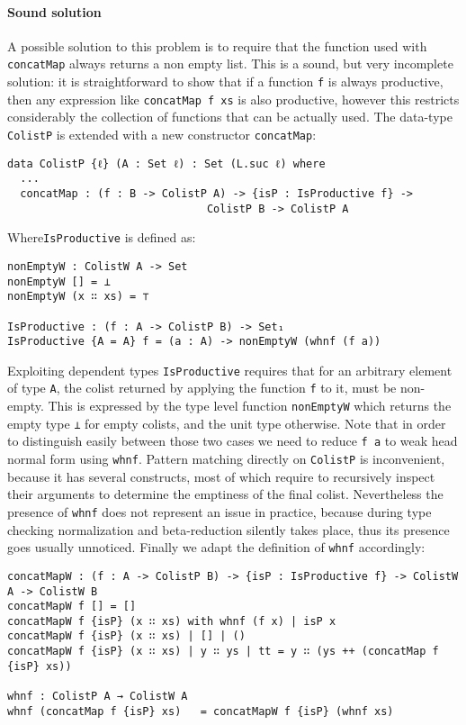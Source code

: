 \documentclass[10pt,a4paper]{article}
\begin{document}
\paragraph{Sound solution}
A possible solution to this problem is to require that the function used with \texttt{concatMap} always returns a non empty list.
This is a sound, but very incomplete solution: it is straightforward to show that if a function \texttt{f} is always productive, then any expression like \texttt{concatMap f xs} is also productive, however this restricts considerably the collection of functions that can be actually used.
The data-type \texttt{ColistP} is extended with a new constructor \texttt{concatMap}:
\begin{verbatim}
data ColistP {ℓ} (A : Set ℓ) : Set (L.suc ℓ) where
  ...
  concatMap : (f : B -> ColistP A) -> {isP : IsProductive f} -> 
  					           ColistP B -> ColistP A
\end{verbatim}
Where\texttt{IsProductive} is defined as:
\begin{verbatim}
nonEmptyW : ColistW A -> Set
nonEmptyW [] = ⊥
nonEmptyW (x ∷ xs) = ⊤

IsProductive : (f : A -> ColistP B) -> Set₁
IsProductive {A = A} f = (a : A) -> nonEmptyW (whnf (f a))
\end{verbatim}
Exploiting dependent types \texttt{IsProductive} requires that for an arbitrary
element of type \texttt{A}, the colist returned by applying the function \texttt{f} to it, must be non-empty. This is expressed by the type level function \texttt{nonEmptyW} which returns the empty type \texttt{⊥} for empty colists, and the unit type otherwise.
Note that in order to distinguish easily between those two cases we need to reduce \texttt{f a} to weak head normal form using \texttt{whnf}.
Pattern matching directly on \texttt{ColistP} is inconvenient, because it has several constructs, most of which require to recursively inspect their arguments to determine the emptiness of the final colist.
Nevertheless the presence of \texttt{whnf} does not represent an issue in practice, because during type checking normalization and beta-reduction silently takes place, thus its presence goes usually unnoticed.
Finally we adapt the definition of \texttt{whnf} accordingly:
\begin{verbatim}
concatMapW : (f : A -> ColistP B) -> {isP : IsProductive f} -> ColistW A -> ColistW B
concatMapW f [] = []
concatMapW f {isP} (x ∷ xs) with whnf (f x) | isP x
concatMapW f {isP} (x ∷ xs) | [] | ()
concatMapW f {isP} (x ∷ xs) | y ∷ ys | tt = y ∷ (ys ++ (concatMap f {isP} xs))

whnf : ColistP A → ColistW A
whnf (concatMap f {isP} xs)   = concatMapW f {isP} (whnf xs)
\end{verbatim}
\end{document}
